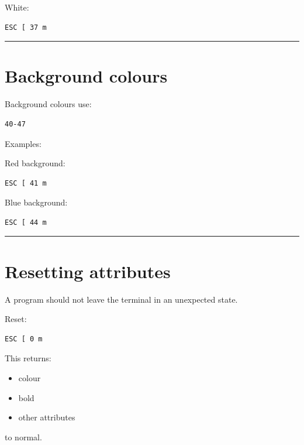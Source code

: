 \documentclass[
  oneside,
  openany]{book}
\providecommand{\tightlist}{%
  \setlength{\itemsep}{0pt}\setlength{\parskip}{0pt}}
\begin{document}
White:

\begin{verbatim}
ESC [ 37 m
\end{verbatim}

\begin{center}\rule{0.5\linewidth}{0.5pt}\end{center}

\hypertarget{background-colours}{%
\section{Background colours}\label{background-colours}}

Background colours use:

\begin{verbatim}
40-47
\end{verbatim}

Examples:

Red background:

\begin{verbatim}
ESC [ 41 m
\end{verbatim}

Blue background:

\begin{verbatim}
ESC [ 44 m
\end{verbatim}

\begin{center}\rule{0.5\linewidth}{0.5pt}\end{center}

\hypertarget{resetting-attributes}{%
\section{Resetting attributes}\label{resetting-attributes}}

A program should not leave the terminal in an unexpected state.

Reset:

\begin{verbatim}
ESC [ 0 m
\end{verbatim}

This returns:

\begin{itemize}
\tightlist
\item
  colour
\item
  bold
\item
  other attributes
\end{itemize}

to normal.
\end{document}
